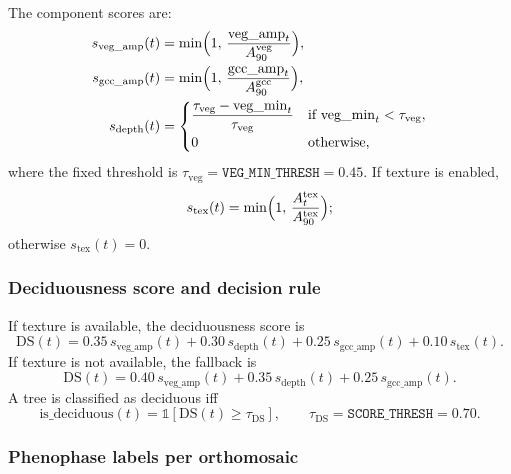 \documentclass{article}
\begin{document}
The component scores are:
\begin{align}
 s_{\mathrm{veg\_amp}}(t) &= \min\Bigl(1,\, \frac{\mathrm{veg\_amp}_t}{A_{90}^{\mathrm{veg}}}\Bigr),\\
 s_{\mathrm{gcc\_amp}}(t) &= \min\Bigl(1,\, \frac{\mathrm{gcc\_amp}_t}{A_{90}^{\mathrm{gcc}}}\Bigr),\\
 s_{\mathrm{depth}}(t) &=
\begin{cases}
\dfrac{\tau_{\mathrm{veg}}-\mathrm{veg\_min}_t}{\tau_{\mathrm{veg}}} & \text{if } \mathrm{veg\_min}_t < \tau_{\mathrm{veg}},\\
0 & \text{otherwise,}
\end{cases}
\end{align}
where the fixed threshold is $\tau_{\mathrm{veg}}=\texttt{VEG\_MIN\_THRESH}=0.45$.
If texture is enabled,
\begin{equation}
 s_{\mathrm{tex}}(t)=\min\Bigl(1,\,\frac{A_t^{\mathrm{tex}}}{A_{90}^{\mathrm{tex}}}\Bigr);
\end{equation}
otherwise $s_{\mathrm{tex}}(t)=0$.

\subsubsection{Deciduousness score and decision rule}

If texture is available, the deciduousness score is
\begin{equation}
\mathrm{DS}(t)=0.35\,s_{\mathrm{veg\_amp}}(t)+0.30\,s_{\mathrm{depth}}(t)+0.25\,s_{\mathrm{gcc\_amp}}(t)+0.10\,s_{\mathrm{tex}}(t).
\end{equation}
If texture is not available, the fallback is
\begin{equation}
\mathrm{DS}(t)=0.40\,s_{\mathrm{veg\_amp}}(t)+0.35\,s_{\mathrm{depth}}(t)+0.25\,s_{\mathrm{gcc\_amp}}(t).
\end{equation}
A tree is classified as deciduous iff
\begin{equation}
\mathrm{is\_deciduous}(t)=\mathbb{1}[\mathrm{DS}(t)\ge \tau_{\mathrm{DS}}],\qquad \tau_{\mathrm{DS}}=\texttt{SCORE\_THRESH}=0.70.
\end{equation}

\subsubsection{Phenophase labels per orthomosaic}
\end{document}
